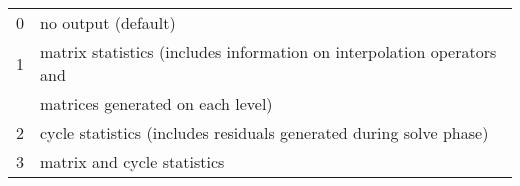 \begin{tabular}{l l}
 0 & no output (default) \\
 1 & matrix statistics (includes information on interpolation operators and \\
 & matrices generated on each level) \\
 2 & cycle statistics (includes residuals generated during solve phase) \\
 3 & matrix and cycle statistics \\
\end{tabular}

